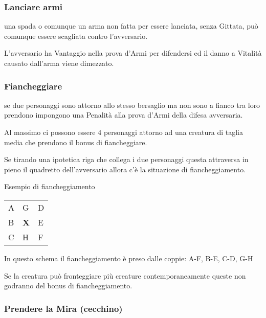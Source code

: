 \documentclass[12pt,a4paper,twoside,openany]{book}
\begin{document}
\begin{multicols}{2}
\subsubsection{Lanciare armi} \label{lanciarearmi}

una spada o comunque un arma non fatta per essere lanciata, senza Gittata, può comunque essere scagliata contro l'avversario.

L'avversario ha Vantaggio nella prova d'Armi per difendersi ed il danno a Vitalità causato dall'arma viene dimezzato.

\subsubsection{Fiancheggiare} \label{fiancheggiare}

se due personaggi sono attorno allo stesso bersaglio ma non sono a fianco tra loro prendono impongono una Penalità alla prova d'Armi della difesa avversaria.

Al massimo ci possono essere 4 personaggi attorno ad una creatura di taglia media che prendono il bonus di fiancheggiare.

Se tirando una ipotetica riga che collega i due personaggi questa attraversa in pieno il quadretto dell'avversario allora c'è la situazione di fiancheggiamento.

\bigskip

Esempio di fiancheggiamento

\medskip

\begin{tabularx}{0.45\textwidth}{lll}
\toprule
A &  G &  D\\
B & \textbf{X}  &  E\\
C &  H &  F\\
\end{tabularx}

\bigskip

In questo schema il fiancheggiamento è preso dalle coppie: A-F, B-E, C-D, G-H

\bigskip

Se la creatura può fronteggiare più creature contemporaneamente queste non godranno del bonus di fiancheggiamento.


\subsubsection{Prendere la Mira (cecchino)} \label{cecchino}


\end{multicols}
\end{document}
